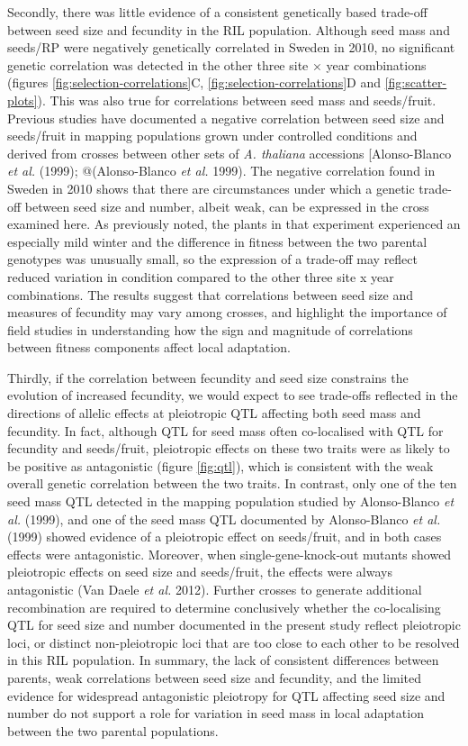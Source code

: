 \documentclass[]{article}
\begin{document}
Secondly, there was little evidence of a consistent genetically based trade-off between seed size and fecundity in the RIL population. Although seed mass and seeds/RP were negatively genetically correlated in Sweden in 2010, no significant genetic correlation was detected in the other three site × year combinations (figures \ref{fig:selection-correlations}C, \ref{fig:selection-correlations}D and \ref{fig:scatter-plots}). This was also true for correlations between seed mass and seeds/fruit. Previous studies have documented a negative correlation between seed size and seeds/fruit in mapping populations grown under controlled conditions and derived from crosses between other sets of \emph{A. thaliana} accessions {[}Alonso-Blanco \emph{et al.} (1999); @(Alonso-Blanco \emph{et al.} 1999). The negative correlation found in Sweden in 2010 shows that there are circumstances under which a genetic trade-off between seed size and number, albeit weak, can be expressed in the cross examined here. As previously noted, the plants in that experiment experienced an especially mild winter and the difference in fitness between the two parental genotypes was unusually small, so the expression of a trade-off may reflect reduced variation in condition compared to the other three site x year combinations. The results suggest that correlations between seed size and measures of fecundity may vary among crosses, and highlight the importance of field studies in understanding how the sign and magnitude of correlations between fitness components affect local adaptation.

Thirdly, if the correlation between fecundity and seed size constrains the evolution of increased fecundity, we would expect to see trade-offs reflected in the directions of allelic effects at pleiotropic QTL affecting both seed mass and fecundity. In fact, although QTL for seed mass often co-localised with QTL for fecundity and seeds/fruit, pleiotropic effects on these two traits were as likely to be positive as antagonistic (figure \ref{fig:qtl}), which is consistent with the weak overall genetic correlation between the two traits. In contrast, only one of the ten seed mass QTL detected in the mapping population studied by Alonso-Blanco \emph{et al.} (1999), and one of the seed mass QTL documented by Alonso-Blanco \emph{et al.} (1999) showed evidence of a pleiotropic effect on seeds/fruit, and in both cases effects were antagonistic. Moreover, when single-gene-knock-out mutants showed pleiotropic effects on seed size and seeds/fruit, the effects were always antagonistic (Van Daele \emph{et al.} 2012). Further crosses to generate additional recombination are required to determine conclusively whether the co-localising QTL for seed size and number documented in the present study reflect pleiotropic loci, or distinct non-pleiotropic loci that are too close to each other to be resolved in this RIL population. In summary, the lack of consistent differences between parents, weak correlations between seed size and fecundity, and the limited evidence for widespread antagonistic pleiotropy for QTL affecting seed size and number do not support a role for variation in seed mass in local adaptation between the two parental populations.
\end{document}
